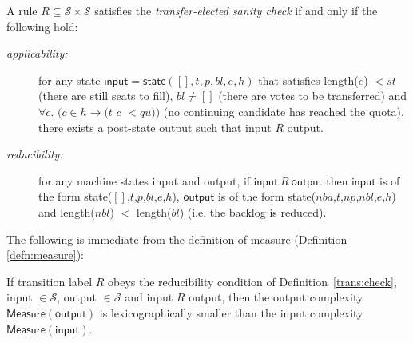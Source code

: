 \documentclass{llncs}
\begin{document}
\begin{definition}\label{trans:check}
A rule $R \subseteq \mathcal{S} \times \mathcal{S}$ satisfies the
\emph{transfer-elected sanity check}  if and only if the following
hold:
\begin{description}
\item[\it applicability:] for any state 
$\mathsf{input} = \mathsf{state}([],t,p,bl,e,h)$ that satisfies 
\textsf{length}($e$) $< st$  (there are still seats to fill), $bl
\neq []$ (there are votes to be transferred) and 
$\forall c.$ $(c \in h \rightarrow (t$ $c$ $< qu))$  (no continuing candidate
has reached the quota), there exists a post-state 
\textsf{output} such that \textsf{input} $R$ \textsf{output}.

\item[\it reducibility:] for any machine states \textsf{input} and
\textsf{output}, if 
$\mathsf{input} ~R~ \mathsf{output}$ then
$\mathsf{input}$ is of the form 
\textsf{state}($[]$,$t$,$p$,$bl$,$e$,$h$), $\mathsf{output}$ is of
the form 
\textsf{state}($nba$,$t$,$np$,$nbl$,$e$,$h$) and \textsf{length}($nbl$)
$<$ \textsf{length}($bl$) (i.e. the backlog is reduced). 
\end{description}
\end{definition}

\noindent
The following is immediate from the definition of measure
(Definition \ref{defn:measure}):
\begin{theorem}\label{trans:red}
If transition label $R$ obeys the reducibility
condition of Definition~\ref{trans:check},
\textsf{input} $\in\mathcal{S}$, 
\textsf{output} $\in\mathcal{S}$ and \textsf{input}
$R$ \textsf{output},
then the \textsf{output} complexity 
$\mathsf{Measure}(\mathsf{output})$
is lexicographically smaller than
the \textsf{input} complexity
$\mathsf{Measure}(\mathsf{input})$.
\end{theorem}
\end{document}

